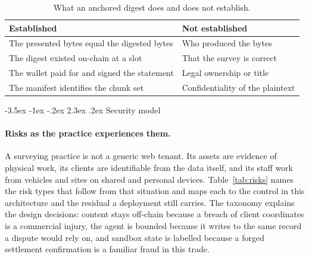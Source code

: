 \documentclass[10pt,a4paper,twocolumn]{article}
\makeatletter
\renewcommand\section{\@startsection{section}{1}{\z@}
  {-3.5ex \@plus -1ex \@minus -.2ex}
  {2.3ex \@plus.2ex}
  {\normalfont\Large\bfseries\hyphenpenalty=10000\exhyphenpenalty=10000}}
\makeatother
\begin{document}
\begin{table}[t]
\centering
\caption{What an anchored digest does and does not establish.}
\label{tab:proves}
\small
\begin{tabular}{@{}ll@{}}
\toprule
Established & Not established \\
\midrule
The presented bytes equal the digested bytes & Who produced the bytes \\
The digest existed on-chain at a slot & That the survey is correct \\
The wallet paid for and signed the statement & Legal ownership or title \\
The manifest identifies the chunk set & Confidentiality of the plaintext \\
\bottomrule
\end{tabular}
\end{table}

\section{Security model}
\label{sec:security}

\paragraph{Risks as the practice experiences them.}
A surveying practice is not a generic web tenant. Its assets are evidence of physical
work, its clients are identifiable from the data itself, and its staff work from
vehicles and sites on shared and personal devices. Table~\ref{tab:risks} names the
risk types that follow from that situation and maps each to the control in this
architecture and the residual a deployment still carries. The taxonomy explains the
design decisions: content stays off-chain because a breach of client coordinates is
a commercial injury, the agent is bounded because it writes to the same record a
dispute would rely on, and sandbox state is labelled because a forged settlement
confirmation is a familiar fraud in this trade.
\end{document}
